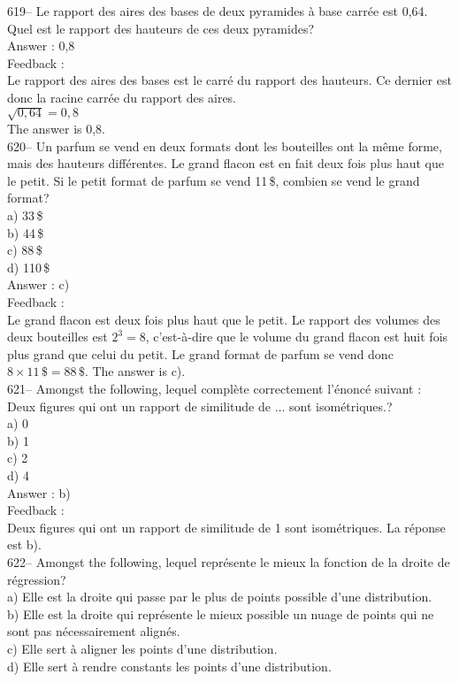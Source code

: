 ﻿\documentclass[letterpaper, 12pt]{article}
\begin{document}
619-- Le rapport des aires des bases de deux pyramides \`a base carr\'ee est
0,64.  Quel est le rapport des hauteurs de ces deux pyramides?\\

Answer : 0,8\\

Feedback : \\
Le rapport des aires des bases est le carr\'e du rapport des hauteurs.  Ce
dernier est donc la racine carr\'ee du rapport des aires.  \\
$\sqrt{0,64}=0,8$  \\
The answer is 0,8.\\


620-- Un parfum se vend en deux formats dont les bouteilles ont la m\^eme
forme, mais des hauteurs diff\'erentes.  Le grand flacon est en fait deux
fois plus haut que le petit.  Si le petit format de parfum se vend 11\,\$,
combien se vend le grand format?\\
a) 33\,\$\\
b) 44\,\$\\
c) 88\,\$\\
d) 110\,\$\\

Answer : c)\\

Feedback : \\
Le grand flacon est deux fois plus haut que le petit. Le rapport des volumes
des deux bouteilles est $2^{3}=8$, c'est-\`a-dire que le volume du grand
flacon est huit fois plus grand que celui du petit.  Le grand format de
parfum se vend donc $8\times11\,\$=88\,\$$.  The answer is c).\\


621-- Amongst the following, lequel compl\`ete
correctement l'\'enonc\'e suivant : \og Deux figures qui ont un
rapport de similitude de $\ldots$ sont isom\'etriques.\fg?\\
a) 0\\
b) 1\\
c) 2\\
d) 4\\

Answer : b) \\

Feedback : \\
Deux figures qui ont un rapport de similitude de 1 sont isom\'etriques.  La
r\'eponse est b).\\


622-- Amongst the following, lequel repr\'esente le mieux la
fonction de la droite de r\'egression?\\
a) Elle est la droite qui passe par le plus de points possible d'une
distribution.\\
b) Elle est la droite qui repr\'esente le mieux possible un nuage de points
qui ne sont pas n\'ecessairement align\'es.\\
c) Elle sert \`a aligner les points d'une distribution.\\
d) Elle sert \`a rendre constants les points d'une distribution.\\
\end{document}
